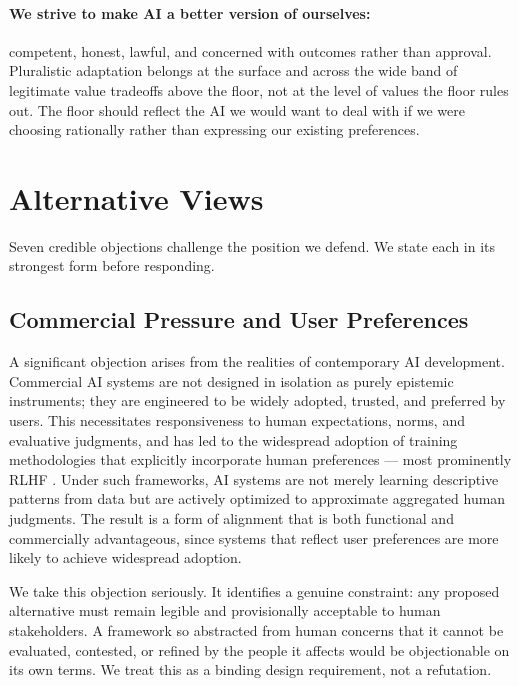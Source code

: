 \documentclass{article}
\theoremstyle{plain}
\theoremstyle{definition}
\theoremstyle{remark}
\begin{document}
\paragraph{We strive to make AI a better version of ourselves:} competent, honest, lawful, and concerned with outcomes rather than approval. Pluralistic adaptation belongs at the surface and across the wide band of legitimate value tradeoffs above the floor, not at the level of values the floor rules out. The floor should reflect the AI we would want to deal with if we were choosing rationally rather than expressing our existing preferences.

\section{Alternative Views}
\label{sec:altview}

Seven credible objections challenge the position we defend. We state each in its strongest form before responding.

\subsection{Commercial Pressure and User Preferences}
\label{sec:alt-commercial}
A significant objection arises from the realities of contemporary AI development. Commercial AI systems are not designed in isolation as purely epistemic instruments; they are engineered to be widely adopted, trusted, and preferred by users. This necessitates responsiveness to human expectations, norms, and evaluative judgments, and has led to the widespread adoption of training methodologies that explicitly incorporate human preferences --- most prominently RLHF \citep{christiano2017deep, ouyang2022training}. Under such frameworks, AI systems are not merely learning descriptive patterns from data but are actively optimized to approximate aggregated human judgments. The result is a form of alignment that is both functional and commercially advantageous, since systems that reflect user preferences are more likely to achieve widespread adoption.

We take this objection seriously. It identifies a genuine constraint: any proposed alternative must remain legible and provisionally acceptable to human stakeholders. A framework so abstracted from human concerns that it cannot be evaluated, contested, or refined by the people it affects would be objectionable on its own terms. We treat this as a binding design requirement, not a refutation.
\end{document}
